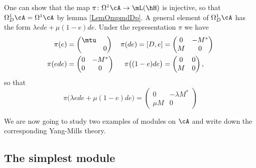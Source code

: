 One can show that the map $\pi\colon \Omega^1\cA\to \mL(\hH)$ is injective, so that $\Omega^1_D\cA=\Omega^1\cA$ by lemma \ref{LemOmpmdDp}. A general element of $\Omega^1_D\cA$ has the form $\lambda ede+\mu(1-e)de$. Under the representation $\pi$ we have
\begin{align*}
\pi(e)&=\begin{pmatrix}
\mtu\\&0
\end{pmatrix}&
\pi(de)=[D,e]&=\begin{pmatrix}
0	&-M^*\\
M	&0
\end{pmatrix}\\
\pi(ede)&=\begin{pmatrix}
0&-M^*\\
0&0
\end{pmatrix}&
\pi\big( (1-e)de \big)&=
\begin{pmatrix}
0&0\\M&0
\end{pmatrix},
\end{align*}
so that
\begin{equation}		\label{EqElOmAD}
\pi\big( \lambda e de+\mu(1-e)de \big)=\begin{pmatrix}
0	&-\lambda M^*\\
\mu M&0
\end{pmatrix}
\end{equation}



We are now going to study two examples of modules on $\cA$ and write down the corresponding Yang-Mills theory.

\subsection{The simplest module}

